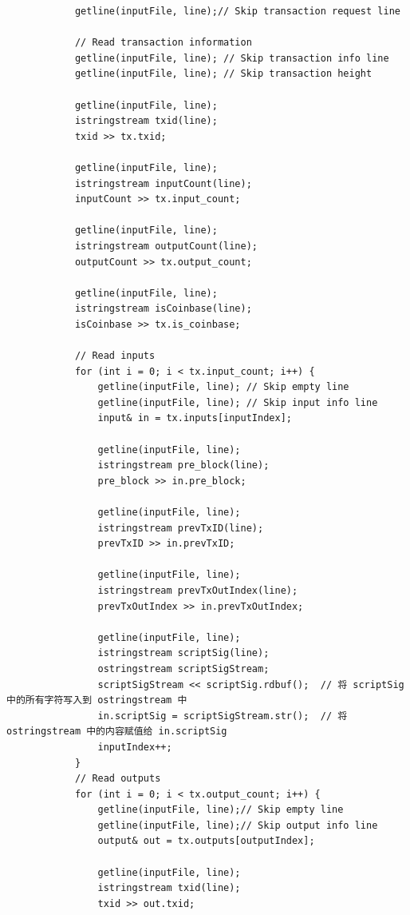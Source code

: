 \documentclass[10pt,a4paper]{article}
\begin{document}
\begin{verbatim}
            getline(inputFile, line);// Skip transaction request line
    
            // Read transaction information
            getline(inputFile, line); // Skip transaction info line
            getline(inputFile, line); // Skip transaction height
    
            getline(inputFile, line);
            istringstream txid(line);
            txid >> tx.txid;
    
            getline(inputFile, line);
            istringstream inputCount(line);
            inputCount >> tx.input_count;
    
            getline(inputFile, line);
            istringstream outputCount(line);
            outputCount >> tx.output_count;
    
            getline(inputFile, line);
            istringstream isCoinbase(line);
            isCoinbase >> tx.is_coinbase;
    
            // Read inputs
            for (int i = 0; i < tx.input_count; i++) {
                getline(inputFile, line); // Skip empty line
                getline(inputFile, line); // Skip input info line
                input& in = tx.inputs[inputIndex];
                
                getline(inputFile, line);
                istringstream pre_block(line);
                pre_block >> in.pre_block;
                
                getline(inputFile, line);
                istringstream prevTxID(line);
                prevTxID >> in.prevTxID;
    
                getline(inputFile, line);
                istringstream prevTxOutIndex(line);
                prevTxOutIndex >> in.prevTxOutIndex;
    
                getline(inputFile, line);
                istringstream scriptSig(line);
                ostringstream scriptSigStream;
                scriptSigStream << scriptSig.rdbuf();  // 将 scriptSig 中的所有字符写入到 ostringstream 中
                in.scriptSig = scriptSigStream.str();  // 将 ostringstream 中的内容赋值给 in.scriptSig
                inputIndex++;
            }
            // Read outputs
            for (int i = 0; i < tx.output_count; i++) {
                getline(inputFile, line);// Skip empty line
                getline(inputFile, line);// Skip output info line
                output& out = tx.outputs[outputIndex];
    
                getline(inputFile, line);
                istringstream txid(line);
                txid >> out.txid;
    

\end{verbatim}
\end{document}
